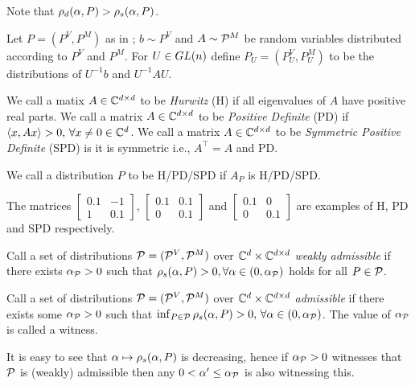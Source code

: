 Note that $\rhod{P}>\rhos{P}$.
\begin{definition}\label{def:simdist}
Let $P=(P^V,P^M)$ as in ; $b\sim P^V$ and $A\sim \P^M$ be random variables distributed according to $P^V$ and $P^M$. For $U\in \gln$ define $P_U=(P_U^V,P_U^M)$ to be the distributions of $U^{-1}b$ and $U^{-1}AU$.
\end{definition}
\begin{definition}
We call a matix $A\in \C^{\dcd}$ to be \emph{Hurwitz} (H) if all eigenvalues of $A$ have positive real parts. We call a matrix $A\in \C^{\dcd}$ to be \emph{Positive Definite} (PD) if $\ip{x,Ax} >0,\,\forall x\neq 0 \in \C^{d}$.  We call a matrix $A\in \C^{\dcd}$ to be \emph{Symmetric Positive Definite} (SPD) is it is symmetric i.e., $A^\top=A$ and PD.
\end{definition}
\begin{definition}\label{distpd}
We call a distribution $P$ to be H/PD/SPD if $A_P$ is H/PD/SPD.
\end{definition}
\begin{example}
The matrices $\begin{bmatrix}0.1 &-1\\ 1 & 0.1\end{bmatrix}$, $\begin{bmatrix} 0.1 & 0.1 \\ 0 & 0.1\end{bmatrix}$ and $\begin{bmatrix}0.1 &0 \\ 0 & 0.1\end{bmatrix}$ are examples of H, PD and SPD respectively.
\end{example}

\begin{definition}
Call a set of distributions $\P=(\P^V,\P^M)$ over $\C^{d}\times \C^{\dcd}$
\emph{weakly admissible} if there exists $\alpha_{\P}>0$ such that
$\rhos{P}>0,\forall \alpha\in(0,\alpha_{\P})$ holds for all $P\in \P$.
\end{definition}
\begin{definition}
Call a set of distributions $\P=(\P^V,\P^M)$ over $\C^{d}\times \C^{\dcd}$ \emph{admissible}
if there exists some $\alpha_{\P}>0$ such that $\inf_{P\in \P} \rhos{P}>0,\,\forall \alpha\in(0,\alpha_{\P})$.
The value of $\alpha_{\P}$ is called a witness.
\end{definition}

It is easy to see that $\alpha \mapsto \rhos{P}$ is decreasing,
hence if $\alpha_{\P}>0$ witnesses that $\P$ is (weakly) admissible
then any $0<\alpha'\le \alpha_{\P}$ is also witnessing this.
